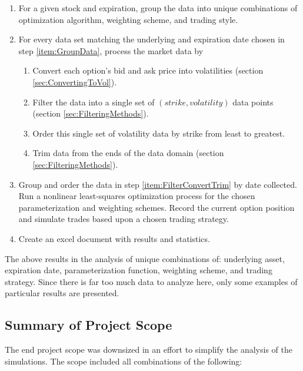 \documentclass[12pt, a4paper, notitlepage]{article}
\numberwithin{equation}{subsection}
\numberwithin{figure}{subsection}
\numberwithin{table}{subsection}
\begin{document}
\begin{enumerate}
	\item For a given stock and expiration, group the data into unique combinations of optimization algorithm, weighting scheme, and trading style.\label{item:GroupData}
    \item For every data set matching the underlying and expiration date chosen in step \ref{item:GroupData}, process the market data by
    \begin{enumerate}
    	 \item Convert each option's bid and ask price into volatilities (section \ref{sec:ConvertingToVol}).
         \item Filter the data into a single set of $(strike, volatility)$ data points (section \ref{sec:FilteringMethods}).
         \item Order this single set of volatility data by strike from least to greatest.
         \item Trim data from the ends of the data domain (section \ref{sec:FilteringMethods}).\label{item:FilterConvertTrim}
    \end{enumerate}
	\item Group and order the data in step \ref{item:FilterConvertTrim} by date collected.  Run a nonlinear least-squares optimization process for the chosen parameterization and weighting schemes.  Record the current option position and simulate trades based upon a chosen trading strategy.
   \item Create an excel document with results and statistics.
\end{enumerate}

The above results in the analysis of unique combinations of: underlying asset, expiration date, parameterization function, weighting scheme, and trading strategy.  Since there is far too much data to analyze here, only some examples of particular results are presented.

\subsection{Summary of Project Scope}
The end project scope was downsized in an effort to simplify the analysis of the simulations. The scope included all combinations of the following:
\end{document}
